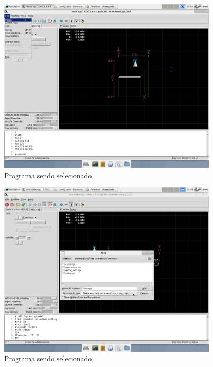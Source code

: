 \documentclass[twoside,a4paper]{refart}
\begin{document}
\begin{figure}[H]
    \begin{center}
        \includegraphics[width=0.95\textwidth]{imagens/Selecao_do_programa2.png}
    \end{center}
    \caption{Programa sendo selecionado}\label{progselec}
\end{figure}

\begin{figure}[H]
    \begin{center}
        \includegraphics[width=0.95\textwidth]{imagens/Selecao_do_programa.png}
    \end{center}
    \caption{Programa sendo selecionado}\label{progselec2}
\end{figure}
\end{document}
